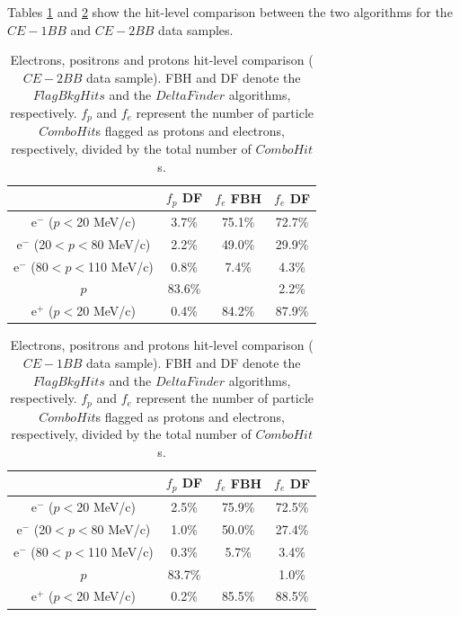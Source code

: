 Tables \ref{tab:2bbcele} and \ref{tab:1bbcele} 
show the hit-level 
comparison between the two algorithms 
for the $CE-1BB$ and $CE-2BB$ data 
samples.
\begin{center}
    \begin{table}[h!]
    \centering
    \renewcommand{\arraystretch}{1.}
    \begin{tabular}{| c | c | c | c |} 
    \hline
    &    $f_{p}$ DF & $f_{e}$ FBH  & $f_{e}$ DF \\
    \hline
    e$^-$ ($p<$20 MeV/c)      & 3.7\%   & 75.1\% & 72.7\%\\
    \hline
    e$^-$ (20$<p<$80 MeV/c)  & 2.2\%   & 49.0\%& 29.9\%\\
    \hline
    e$^-$ (80$<p<$110 MeV/c)  & 0.8\%  &  7.4\%& 4.3\%\\
    \hline
    $p$       &  83.6\%  &  & 2.2\%\\
    \hline
    e$^+$ ($p<$20 MeV/c) & 0.4\%    &   84.2\%& 87.9\%\\
    \hline
    \end{tabular}
    \caption{Electrons, 
    positrons and protons hit-level 
    comparison ($CE-2BB$ data sample). 
    FBH and DF denote  
    the $FlagBkgHits$ and the 
    $DeltaFinder$ algorithms, 
    respectively. $f_p$ and $f_e$ represent 
    the number of particle $ComboHit$s 
    flagged as protons and electrons, respectively, 
    divided by the total number of $ComboHit$s.
    }\label{tab:2bbcele}
    \end{table}
    \end{center}

    \begin{center}
    \begin{table}[h!]
    \centering
    \renewcommand{\arraystretch}{1.}
    \begin{tabular}{| c | c | c | c |} 
    \hline
   &  $f_{p}$ DF & $f_{e}$ FBH  & $f_{e}$ DF \\
    \hline
    e$^-$ ($p<$20 MeV/c)     & 2.5\%   & 75.9\% & 72.5\%\\
    \hline
    e$^-$ (20$<p<$80 MeV/c)  & 1.0\%   & 50.0\%& 27.4\%\\
    \hline
    e$^-$ (80$<p<$110 MeV/c)   & 0.3\%  &  5.7\%& 3.4\%\\
    \hline
    $p$                 &         83.7\%   &  & 1.0\%\\
    \hline
    e$^+$ ($p<$20 MeV/c)    & 0.2\%    &   85.5\%& 88.5\%\\
    \hline
    \end{tabular}
    \caption{Electrons, 
    positrons and protons hit-level 
    comparison ($CE-1BB$ data sample). 
    FBH and DF denote the $FlagBkgHits$ 
    and the $DeltaFinder$ 
    algorithms, respectively. $f_p$ and 
    $f_e$ represent 
    the number of particle $ComboHit$s 
    flagged as protons and electrons, respectively, 
    divided by the total number of $ComboHit$s.}
    \label{tab:1bbcele}
    \end{table}
    \end{center}
  

